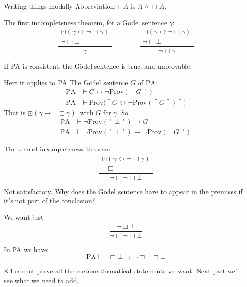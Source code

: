 \documentclass[
  ignorenonframetext,
]{beamer}
\newcommand{\Prov}{\mathrm{Prov}}
\newcommand{\PA}{\mathrm{PA}}
\newcommand{\gn}[1]{\ulcorner #1 \urcorner}
\newcommand{\rul}[2]{\frac{\begin{gathered}#1\end{gathered}}{#2}}
\begin{document}
\begin{frame}{Writing things modally}
\protect{}\label{writing-things-modally}
Abbreviation: \(\boxdot A\) is \(A \land \Box A\).

\bigskip

The first incompleteness theorem, for a Gödel sentence \(\gamma\): \[
    \rul{\boxdot(\gamma \leftrightarrow \lnot\Box\gamma) \\ \lnot\Box\bot}{\gamma}
    \qquad\qquad
    \rul{\boxdot(\gamma \leftrightarrow \lnot\Box\gamma) \\ \lnot\Box\bot}{\lnot\Box\gamma}
\]

\bigskip

If \(\PA\) is consistent, the Gödel sentence is true, and unprovable.
\end{frame}

\begin{frame}{Here it applies to \(\PA\)}
\protect{}\label{here-it-applies-to-pa}
The Gödel sentence \(G\) of \(\PA\): \begin{align*}
    \PA &\vdash G \leftrightarrow \lnot\Prov(\gn{G}) \\
    \PA &\vdash \Prov\bigl(\gn{G \leftrightarrow \lnot\Prov(\gn{G})}\bigr)
\end{align*} That is
\(\boxdot(\gamma \leftrightarrow \lnot\Box\gamma)\), with \(G\) for
\(\gamma\). So \begin{align*}
    \PA &\vdash \lnot\Prov(\gn{\bot}) \to G \\
    \PA &\vdash \lnot\Prov(\gn{\bot}) \to \lnot\Prov(\gn{G})
\end{align*}
\end{frame}

\begin{frame}{The second incompleteness theorem}
\protect{}\label{the-second-incompleteness-theorem}
\[ \rul{\boxdot(\gamma \leftrightarrow \lnot\Box\gamma) \\ \lnot\Box\bot}{\lnot\Box\lnot\Box\bot} \]

Not satisfactory. Why does the Gödel sentence have to appear in the
premises if it's not part of the conclusion?

\bigskip

We want just \[ \rul{\lnot\Box\bot}{\lnot\Box\lnot\Box\bot} \]

\bigskip

In PA we have: \[ \PA \vdash \lnot\Box\bot \to \lnot\Box\lnot\Box\bot \]

\bigskip

K4 cannot prove all the metamathematical statements we want. Next part
we'll see what we need to add.
\end{frame}
\end{document}
